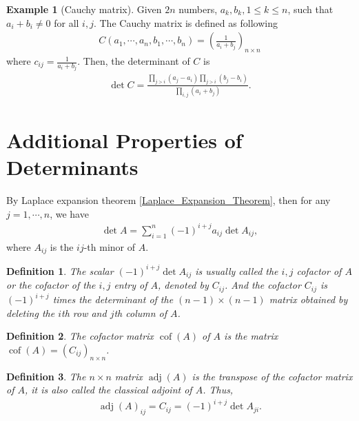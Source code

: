 \documentclass[11pt]{book}
\newtheorem{definition}{Definition}[section]
\theoremstyle{definition}
\newtheorem{example}{Example}[section]
\numberwithin{equation}{chapter}
\begin{document}
\medskip

\begin{example}[Cauchy matrix]
Given $2n$ numbers, $a_k, b_k, 1\leq k\leq n$, such that $a_i + b_i \neq 0$ for all $i,j$. The Cauchy matrix is defined as following
\begin{align*}
    C(a_1,\cdots,a_n, b_1,\cdots,b_n) = \left(\frac{1}{a_i + b_j}\right)_{n\times n}
\end{align*}
where $c_{ij} = \frac{1}{a_i + b_j}$. Then, the determinant of $C$ is 
\begin{align*}
    \det C = \frac{\prod_{j>i}(a_j - a_i)\prod_{j>i}(b_j - b_i)}{\prod_{i,j}(a_i + b_j)}.
\end{align*}
\end{example}

\medskip

\section{Additional Properties of Determinants}
By Laplace expansion theorem \ref{Laplace_Expansion_Theorem}, then for any $j = 1, \cdots, n$, we have
\begin{align*}
    \det A = \sum^n_{i=1} (-1)^{i+j} a_{ij} \det A_{ij},
\end{align*}
where $A_{ij}$ is the $ij$-th minor of $A$.

\medskip

\begin{definition}
The scalar $(-1)^{i+j} \det A_{ij}$ is usually called the $i,j$ cofactor of $A$ or the cofactor of the $i,j$ entry of $A$, denoted by $C_{ij}$. And the cofactor $C_{ij}$ is $(-1)^{i+j}$ times the determinant of the $(n-1) \times (n-1)$ matrix obtained by deleting the $i$th row and $j$th column of $A$.
\end{definition}

\medskip

\begin{definition}
The cofactor matrix $\operatorname{cof}(A)$ of $A$ is the matrix $\operatorname{cof}(A) = \left(C_{ij}\right)_{n \times n}$.
\end{definition}

\medskip

\begin{definition}
The $n \times n$ matrix $\operatorname{adj}(A)$ is the transpose of the cofactor matrix of $A$, it is also called the classical adjoint of $A$. Thus, 
\begin{align*}
    \operatorname{adj}(A)_{ij} = C_{ij} = (-1)^{i+j} \det A_{ji}.
\end{align*}
\end{definition}
\end{document}
